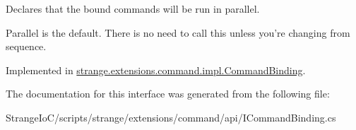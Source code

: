Declares that the bound commands will be run in parallel. 

Parallel is the default. There is no need to call this unless you're changing from sequence. 

Implemented in \hyperlink{classstrange_1_1extensions_1_1command_1_1impl_1_1_command_binding_a25ea62fb08609aaba172f2c1c8c6efa6}{strange.\-extensions.\-command.\-impl.\-Command\-Binding}.



The documentation for this interface was generated from the following file\-:\begin{DoxyCompactItemize}
\item 
Strange\-Io\-C/scripts/strange/extensions/command/api/I\-Command\-Binding.\-cs\end{DoxyCompactItemize}
